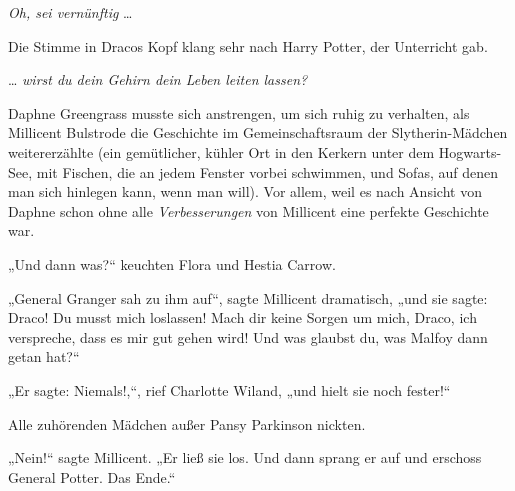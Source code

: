\emph{Oh, sei vernünftig} …

Die Stimme in Dracos Kopf klang sehr nach Harry Potter, der Unterricht gab.

… \emph{wirst du dein Gehirn dein Leben leiten lassen?}


Daphne Greengrass musste sich anstrengen, um sich ruhig zu verhalten, als Millicent Bulstrode die Geschichte im Gemeinschaftsraum der Slytherin-Mädchen weitererzählte (ein gemütlicher, kühler Ort in den Kerkern unter dem Hogwarts-See, mit Fischen, die an jedem Fenster vorbei schwimmen, und Sofas, auf denen man sich hinlegen kann, wenn man will). Vor allem, weil es nach Ansicht von Daphne schon ohne alle \emph{Verbesserungen} von Millicent eine perfekte Geschichte war.

„Und dann was?“ keuchten Flora und Hestia Carrow.

„General Granger sah zu ihm auf“, sagte Millicent dramatisch, „und sie sagte: Draco! Du musst mich loslassen! Mach dir keine Sorgen um mich, Draco, ich verspreche, dass es mir gut gehen wird! Und was glaubst du, was Malfoy dann getan hat?“

„Er sagte: Niemals!,“, rief Charlotte Wiland, „und hielt sie noch fester!“

Alle zuhörenden Mädchen außer Pansy Parkinson nickten.

„Nein!“ sagte Millicent.
„Er ließ sie los. Und dann sprang er auf und erschoss General Potter. Das Ende.“

